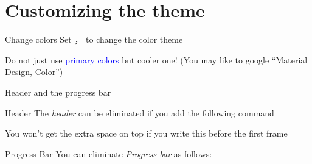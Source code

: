 \section{Customizing the theme}

{

\begin{frame}{Change colors}
    Set ， to change the color theme
    
    \begin{itemize}
      \ngitem Do not just use \textcolor{blue}{primary colors}
        \okitem but cooler one! (You may like to google ``Material Design, Color'')
    \end{itemize}
\end{frame}
}

{

\begin{frame}{Header and the progress bar}
\begin{block}{Header}
  The \emph{header} can be eliminated if you add the following command  
  
    \begin{itemize}
    \okitem
      You won't get the extra space on top if you write this before the first frame
    \end{itemize}
\end{block}

\begin{block}{Progress Bar}
    You can eliminate \emph{Progress bar} as follows:
    
  \end{block}
\end{frame}
}


